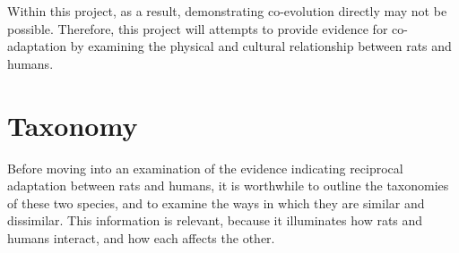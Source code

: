 \documentclass[12pt]{article}
\begin{document}
Within this project, as a result, demonstrating co-evolution directly may not be possible. Therefore, this project will attempts to provide evidence for co-adaptation by examining the physical and cultural relationship between rats and humans.

\section{Taxonomy} \label{Taxonomy}

Before moving into an examination of the evidence indicating reciprocal adaptation between rats and humans, it is worthwhile to outline the taxonomies of these two species, and to examine the ways in which they are similar and dissimilar. This information is relevant, because it illuminates how rats and humans interact, and how each affects the other.
\end{document}
